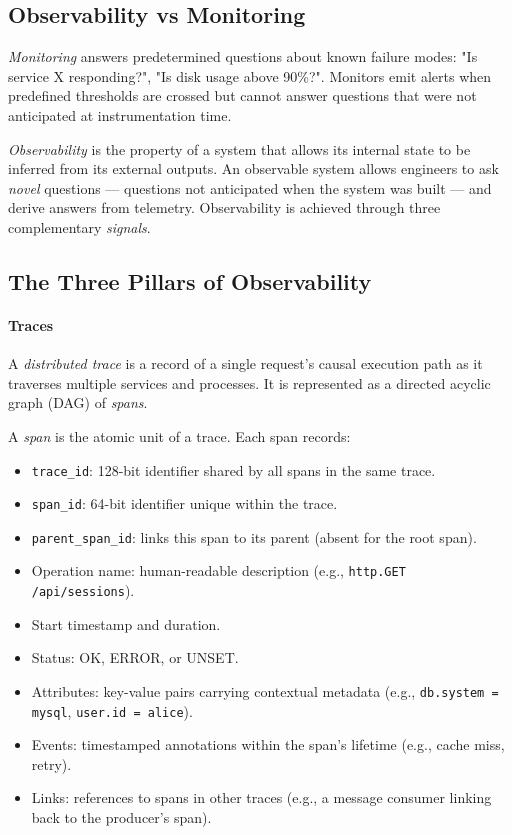 \subsection{Observability vs Monitoring}

\emph{Monitoring} answers predetermined questions about known failure modes: "Is service X responding?", "Is disk usage above 90\%?". Monitors emit alerts when predefined thresholds are crossed but cannot answer questions that were not anticipated at instrumentation time.

\emph{Observability} is the property of a system that allows its internal state to be inferred from its external outputs. An observable system allows engineers to ask \emph{novel} questions — questions not anticipated when the system was built — and derive answers from telemetry. Observability is achieved through three complementary \emph{signals}.

\subsection{The Three Pillars of Observability}

\paragraph{Traces}

A \emph{distributed trace} is a record of a single request's causal execution path as it traverses multiple services and processes. It is represented as a directed acyclic graph (DAG) of \emph{spans}.

A \emph{span} is the atomic unit of a trace. Each span records:
\begin{itemize}
    \item \texttt{trace\_id}: 128-bit identifier shared by all spans in the same trace.
    \item \texttt{span\_id}: 64-bit identifier unique within the trace.
    \item \texttt{parent\_span\_id}: links this span to its parent (absent for the root span).
    \item Operation name: human-readable description (e.g., \texttt{http.GET /api/sessions}).
    \item Start timestamp and duration.
    \item Status: OK, ERROR, or UNSET.
    \item Attributes: key-value pairs carrying contextual metadata (e.g., \texttt{db.system = mysql}, \texttt{user.id = alice}).
    \item Events: timestamped annotations within the span's lifetime (e.g., cache miss, retry).
    \item Links: references to spans in other traces (e.g., a message consumer linking back to the producer's span).
\end{itemize}

